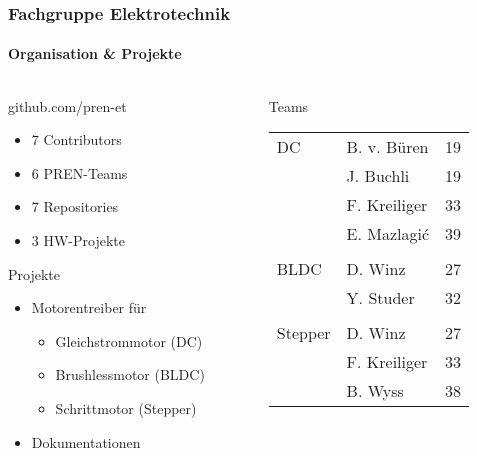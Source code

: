 \begin{frame}
	\frametitle{Fachgruppe Elektrotechnik \hfill{} \footnotesize \group}
	\framesubtitle{Organisation \& Projekte}
	\begin{columns}
		\begin{column}{0.5\textwidth}
			\begin{block}{github.com/pren-et}
				\begin{itemize}
					\item 7 Contributors
					\item 6 PREN-Teams
					\item 7 Repositories
					\item 3 HW-Projekte
				\end{itemize}
			\end{block}
			\begin{block}{Projekte}
				\begin{itemize}
					\item Motorentreiber für
						\begin{itemize}
							\item Gleichstrommotor (DC)
							\item Brushlessmotor (BLDC)
							\item Schrittmotor (Stepper)
						\end{itemize}
					\item Dokumentationen
				\end{itemize}
			\end{block}
		\end{column}
		\begin{column}{0.5\textwidth}
			\begin{exampleblock}{Teams}
				\begin{tabular}{l l r}
					DC
						& B. v. Büren 	& 19 \\
						& J. Buchli 	& 19 \\
						& F. Kreiliger	& 33 \\
						& E. Mazlagi\'c	& 39 \\
					& & \\
					BLDC
						& D. Winz	& 27 \\
						& Y. Studer	& 32 \\
					& & \\
					Stepper
						& D. Winz	& 27 \\
						& F. Kreiliger	& 33 \\
						& B. Wyss	& 38 \\
				\end{tabular}
			\end{exampleblock}
		\end{column}
	\end{columns}
\end{frame}
